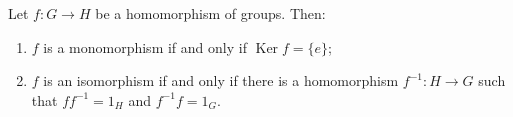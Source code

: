 \begin{theorem}
Let $f: G \rightarrow H$ be a homomorphism of groups. Then:
\begin{enumerate}
    \item[(i)] $f$ is a monomorphism if and only if $\operatorname{Ker} f = \{e\}$;
    \item[(ii)] $f$ is an isomorphism if and only if there is a homomorphism $f^{-1}: H \rightarrow G$ such that $ff^{-1} = 1_H$ and $f^{-1}f = 1_G$.
\end{enumerate}
\end{theorem}
